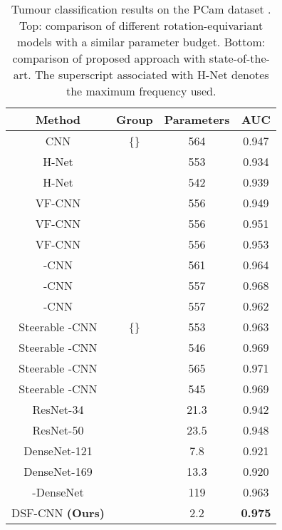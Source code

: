 \documentclass[journal]{IEEEtran}
\begin{document}
	    		   \begin{table}[h]
	\begin{center}
		\caption{Tumour classification results on the PCam dataset \cite{veeling2018rotation}. Top: comparison of different rotation-equivariant models with a similar parameter budget. Bottom: comparison of proposed approach with state-of-the-art. The superscript associated with H-Net denotes the maximum frequency used.}
		\label{dup1 table:comparative_pcam}
		\setlength{\tabcolsep}{3pt} \renewcommand{\arraystretch}{1.0} \begin{tabular}{c|c|c|c}
			 \textbf{Method} & \textbf{Group}  & \textbf{Parameters}  &  \textbf{AUC}  \\
			\midrule
            CNN & \{\} & 564  & 0.947 \\
            H-Net \cite{worrall2017harmonic} &  & 553  & 0.934 \\
            H-Net \cite{worrall2017harmonic} &  & 542  & 0.939 \\
            VF-CNN \cite{marcos2017rotation} &  & 556 & 0.949   \\
            VF-CNN \cite{marcos2017rotation} &  & 556 & 0.951  \\
            VF-CNN \cite{marcos2017rotation} &  & 556 & 0.953   \\
            -CNN \cite{cohen2016group} &  & 561  & 0.964   \\
            -CNN \cite{bekkers2018roto,lafarge2020roto} &  & 557  & 0.968   \\
            -CNN \cite{bekkers2018roto,lafarge2020roto} &  & 557  & 0.962   \\
            Steerable -CNN \cite{weiler2018learning} & \{\} & 553  & 0.963   \\
            Steerable -CNN \cite{weiler2018learning} &  & 546 & 0.969   \\
            Steerable -CNN \cite{weiler2018learning} &  & 565 & 0.971   \\
            Steerable -CNN \cite{weiler2018learning} &  & 545 & 0.969  \\
            \midrule
            ResNet-34 \cite{he2016deep}  &  & 21.3 &  0.942  \\
            ResNet-50 \cite{he2016deep}  &  & 23.5 & 0.948  \\
            DenseNet-121 \cite{densenet} &  & 7.8 & 0.921  \\
            DenseNet-169 \cite{densenet} &  & 13.3 & 0.920  \\
             -DenseNet \cite{veeling2018rotation}  &  & 119 & 0.963   \\
            DSF-CNN \textbf{(Ours)} &  & 2.2 & \textbf{0.975}  \\
			\bottomrule
		\end{tabular}
	\end{center}
	\end{table}	
\end{document}
